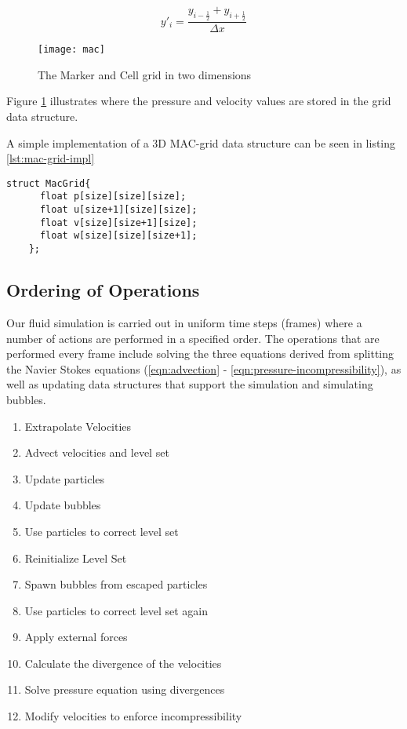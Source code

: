 \documentclass[twocolumn]{article}
\begin{document}
\begin{equation}
y'_i = \frac{y_{i-\frac{1}{2}}+y_{i+\frac{1}{2}}}{\Delta x}
\label{eqn:derivatives-mac}
\end{equation}

\begin{figure}[h!]
  \centering
    \texttt{[image: mac]}
  \caption{The Marker and Cell grid in two dimensions}
  \label{fig:mac-grid}
\end{figure}

Figure \ref{fig:mac-grid} illustrates where the pressure and velocity values are stored in the grid data structure.

A simple implementation of a 3D MAC-grid data structure can be seen in listing \ref{lst:mac-grid-impl}

\begin{lstlisting}[caption={MAC-Grid implementation},label={lst:mac-grid-impl}]
  struct MacGrid{
      float p[size][size][size];
      float u[size+1][size][size];
      float v[size][size+1][size];
      float w[size][size][size+1];
    }; 
\end{lstlisting}

\subsection{Ordering of Operations}Our fluid simulation is carried out in uniform time steps (frames) where a number of actions are performed in a specified order. The operations that are performed every frame include solving the three equations derived from splitting the Navier Stokes equations (\ref{eqn:advection} - \ref{eqn:pressure-incompressibility}), as well as updating data structures that support the simulation and simulating bubbles. 



\begin{enumerate}
    \item Extrapolate Velocities
    \item Advect velocities and level set
    \item Update particles
    \item Update bubbles
    \item Use particles to correct level set
    \item Reinitialize Level Set
    \item Spawn bubbles from escaped particles
    \item Use particles to correct level set again   
    \item Apply external forces
    \item Calculate the divergence of the velocities
    \item Solve pressure equation using divergences
    \item Modify velocities to enforce incompressibility
\end{enumerate}
\end{document}
